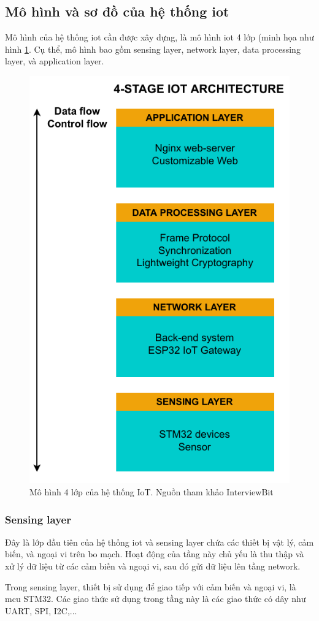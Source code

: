\subsection{Mô hình và sơ đồ của hệ thống \acrshort{iot}}

Mô hình của hệ thống \acrshort{iot} cần được xây dựng, là mô hình \acrshort{iot} 4 lớp (minh họa như hình \ref{fig:IoT-4-Layer-Archi-C2}. Cụ thể, mô hình bao gồm sensing layer, network layer, data processing layer, và application layer.

\begin{figure}[htp]
\centering
\includegraphics[width=8 cm]{images/Thesis-Page-2-IoT-Archi.pdf}
\caption{Mô hình 4 lớp của hệ thống IoT. Nguồn tham khảo InterviewBit~\cite{IoT-4-Layer-Archi}}
\label{fig:IoT-4-Layer-Archi-C2}
\end{figure}

\subsubsection{Sensing layer}

Đây là lớp đầu tiên của hệ thống \acrshort{iot} và sensing layer chứa các thiết bị vật lý, cảm biến, và ngoại vi trên bo mạch. Hoạt động của tầng này chủ yếu là thu thập và xử lý dữ liệu từ các cảm biến và ngoại vi, sau đó gửi dữ liệu lên tầng network.

Trong sensing layer, thiết bị sử dụng để giao tiếp với cảm biến và ngoại vi, là \acrshort{mcu} STM32. Các giao thức sử dụng trong tầng này là các giao thức có dây như UART, SPI, I2C,...

